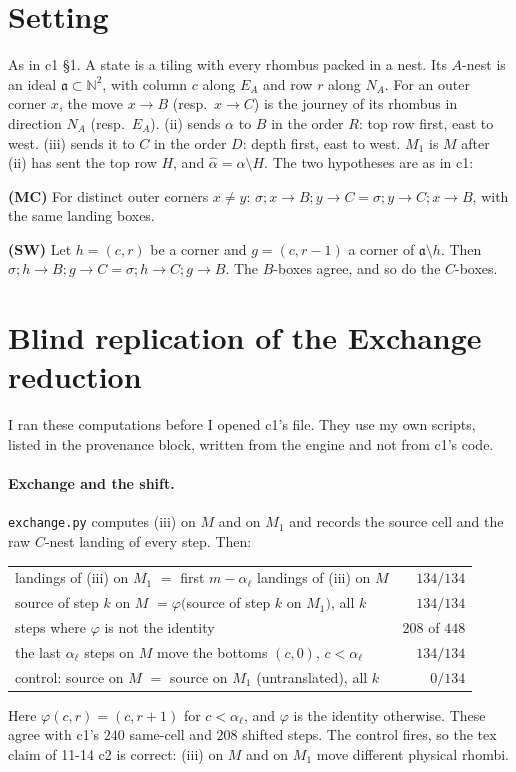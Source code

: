 \documentclass[11pt]{article}
\theoremstyle{definition}
\newcommand{\toB}{\!\to\!B}
\newcommand{\toC}{\!\to\!C}
\begin{document}
\section{Setting}
As in c1 \S1. A state is a tiling with every rhombus packed in a nest. Its $A$-nest is an ideal $\mathfrak a\subset\mathbb N^2$,
with column $c$ along $E_A$ and row $r$ along $N_A$. For an outer corner $x$, the move $x\toB$ (resp.\ $x\toC$) is the journey of its
rhombus in direction $N_A$ (resp.\ $E_A$). (ii) sends $\alpha$ to $B$ in the order $R$: top row first, east to west. (iii) sends it
to $C$ in the order $D$: depth first, east to west. $M_1$ is $M$ after (ii) has sent the top row $H$, and
$\hat\alpha=\alpha\setminus H$. The two hypotheses are as in c1:

\noindent\textbf{(MC)} For distinct outer corners $x\ne y$: $\sigma;x\toB;y\toC=\sigma;y\toC;x\toB$, with the same landing boxes.

\noindent\textbf{(SW)} Let $h=(c,r)$ be a corner and $g=(c,r-1)$ a corner of $\mathfrak a\setminus h$. Then
$\sigma;h\toB;g\toC=\sigma;h\toC;g\toB$. The $B$-boxes agree, and so do the $C$-boxes.

\section{Blind replication of the Exchange reduction}\label{sec:blind}
I ran these computations before I opened c1's file. They use my own scripts, listed in the provenance block, written from the
engine and not from c1's code.

\paragraph{Exchange and the shift.} \texttt{exchange.py} computes (iii) on $M$ and on $M_1$ and records the source cell and the
raw $C$-nest landing of every step. Then:
\begin{center}\begin{tabular}{lr}\toprule
landings of (iii) on $M_1$ $=$ first $m-\alpha_\ell$ landings of (iii) on $M$ & $134/134$\\
source of step $k$ on $M$ $=\varphi($source of step $k$ on $M_1)$, all $k$ & $134/134$\\
\quad steps where $\varphi$ is not the identity & $208$ of $448$\\
the last $\alpha_\ell$ steps on $M$ move the bottoms $(c,0)$, $c<\alpha_\ell$ & $134/134$\\
control: source on $M$ $=$ source on $M_1$ (untranslated), all $k$ & $0/134$\\\bottomrule
\end{tabular}\end{center}
Here $\varphi(c,r)=(c,r+1)$ for $c<\alpha_\ell$, and $\varphi$ is the identity otherwise. These agree with c1's $240$ same-cell and
$208$ shifted steps. The control fires, so the tex claim of 11-14 c2 is correct: (iii) on $M$ and on $M_1$ move different physical rhombi.
\end{document}
